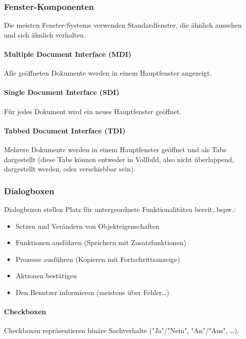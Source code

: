 				\subsubsection{Fenster-Komponenten}
					Die meisten Fenster-Systeme verwenden Standardfenster, die ähnlich aussehen und sich ähnlich verhalten.

					\paragraph{Multiple Document Interface (MDI)}
						Alle geöffneten Dokumente werden in einem Hauptfenster angezeigt.

					\paragraph{Single Document Interface (SDI)}
						Für jedes Dokument wird ein neues Hauptfenster geöffnet.

					\paragraph{Tabbed Document Interface (TDI)}
						Mehrere Dokumente werden in einem Hauptfenster geöffnet und als Tabs dargestellt (diese Tabs können entweder in Vollbild, also nicht überlappend, dargestellt werden, oder verschiebbar sein).

				\subsubsection{Dialogboxen}
					Dialogboxen stellen Platz für untergeordnete Funktionalitäten bereit, bspw.:
					\begin{itemize}
						\item Setzen und Verändern von Objekteigenschaften
						\item Funktionen ausführen (\zB Speichern mit Zusatzfunktionen)
						\item Prozesse ausführen (\zB Kopieren mit Fortschrittsanzeige)
						\item Aktionen bestätigen
						\item Den Benutzer informieren (meistens über Fehler\dots)
					\end{itemize}

					\paragraph{Checkboxen}
						Checkboxen repräsentieren binäre Sachverhalte ("Ja"/"Nein", "An"/"Aus", \dots).

